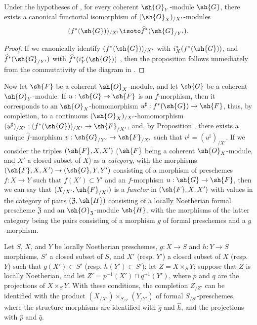 \begin{proposition}[10.9.5]
\label{I.10.9.5}
Under the hypotheses of , for every coherent $\sh{O}_Y$-module $\sh{G}$, there exists a canonical functorial isomorphism of $(\sh{O}_X)_{/X'}$-modules
\[
  (f^*(\sh{G}))_{/X'}\isoto\widehat{f}^*(\sh{G}_{/Y'}).
\]
\end{proposition}

\begin{proof}
If we canonically identify $(f^*(\sh{G}))_{/X'}$ with $i_X^*(f^*(\sh{G}))$, and $\widehat{f}^*(\sh{G}_{/Y'})$ with $\widehat{f}^*(i_Y^*(\sh{G}))$ , then the proposition follows immediately from the commutativity of the diagram in .
\end{proof}

\begin{env}[10.9.6]
\label{I.10.9.6}
Now let $\sh{F}$ be a coherent $\sh{O}_X$-module, and let $\sh{G}$ be a coherent $\sh{O}_Y$-module.
If $u:\sh{G}\to\sh{F}$ is an $f$-morphism, then it corresponds to an $\sh{O}_X$-homomorphism $u^\sharp:f^*(\sh{G})\to\sh{F}$, thus, by completion, to a continuous $(\sh{O}_X)_{/X'}$-homomorphism $(u^\sharp)_{/X'}:(f^*(\sh{G}))_{/X'}\to\sh{F}_{/X'}$, and, by Proposition , there exists a unique $\widehat{f}$-morphism $v:\sh{G}_{/Y'}\to\sh{F}_{/X'}$
such that $v^\sharp=(u^\sharp)_{/X'}$.
If we consider the triples $(\sh{F},X,X')$ ($\sh{F}$ being a coherent $\sh{O}_X$-module, and $X'$ a closed subset of $X$) as a \emph{category}, with the morphisms $(\sh{F},X,X')\to(\sh{G},Y,Y')$ consisting of a morphism of preschemes $f:X\to Y$ such that $f(X')\subset Y'$ and an $f$-morphism $u:\sh{G}\to\sh{F}$, then we can say that $(X_{/X'},\sh{F}_{/X'})$ is a \emph{functor} in $(\sh{F},X,X')$ with values in the category of pairs $(\mathfrak{Z},\sh{H})$ consisting of a locally Noetherian formal prescheme $\mathfrak{Z}$ and an $\sh{O}_\mathfrak{Z}$-module $\sh{H}$, with the morphisms of the latter category being the pairs consisting of a morphism $g$ of formal preschemes and a $g$-morphism.
\end{env}

\begin{proposition}[10.9.7]
\label{I.10.9.7}
Let $S$, $X$, and $Y$ be locally Noetherian preschemes, $g:X\to S$ and $h:Y\to S$ morphisms, $S'$ a closed subset of $S$, and $X'$ (resp. $Y'$) a closed subset of $X$ (resp. $Y$) such that $g(X')\subset S'$ (resp. $h(Y')\subset S'$); let $Z=X\times_S Y$; suppose that $Z$ is locally Noetherian, and let $Z'=p^{-1}(X')\cap q^{-1}(Y')$, where $p$ and $q$ are the projections of $X\times_S Y$.
With these conditions, the completion $Z_{/Z'}$ can be identified with the product $(X_{/X'})\times_{S_{/S'}}(Y_{/Y'})$ of formal $S_{/S'}$-preschemes, where the structure morphisms are identified with $\widehat{g}$ and $\widehat{h}$, and the projections with $\widehat{p}$ and $\widehat{q}$.
\end{proposition}

